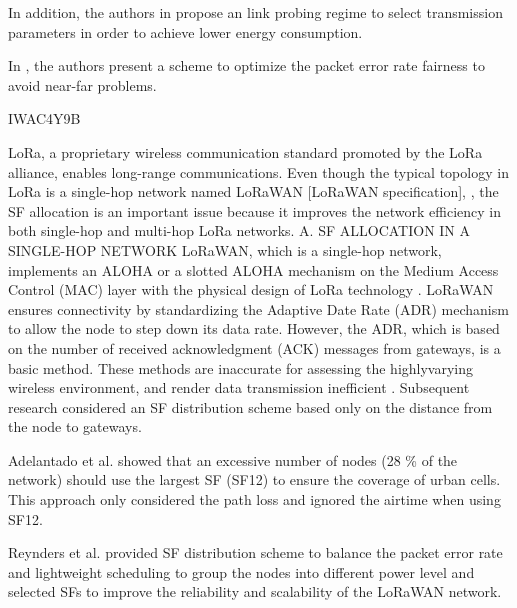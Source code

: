 In addition,
	the authors in \cite{bor_lora_2017} propose an link probing regime to select transmission parameters in order to achieve lower energy consumption.

In \cite{reynders_power_2017},
	the authors present a scheme to optimize the packet error rate fairness to avoid near-far problems.

\cite{zhu_improving_2019} IWAC4Y9B

LoRa,
	a proprietary wireless communication standard promoted by the LoRa alliance,
	enables long-range communications.
Even though the typical topology in LoRa is a single-hop network named LoRaWAN [LoRaWAN specification],
	\cite{pop_does_2017},
	the SF allocation is an important issue because it improves the network efficiency in both single-hop and multi-hop LoRa networks.
A.
SF ALLOCATION IN A SINGLE-HOP NETWORK LoRaWAN,
	which is a single-hop network,
	implements an ALOHA or a slotted ALOHA mechanism on the Medium Access Control (MAC) layer with the physical design of LoRa technology \cite{mahmood_scalability_2019}.
LoRaWAN ensures connectivity by standardizing the Adaptive Date Rate (ADR) mechanism to allow the node to step down its data rate.
However,
	the ADR,
	which is based on the number of received acknowledgment (ACK) messages from gateways,
	is a basic method.
These methods are inaccurate for assessing the highlyvarying wireless environment,
	and render data transmission inefficient \cite{kim_adaptive_2017}.
Subsequent research  \cite{adelantado_understanding_2017}
\cite{reynders_power_2017}
\cite{reynders_improving_2018}
\cite{slabicki_adaptive_2018}
considered an SF distribution scheme based only on the distance from the node to gateways.

Adelantado et al.
\cite{adelantado_understanding_2017} showed that an excessive number of nodes (28 \% of the network) should use the largest SF
(SF12) to ensure the coverage of urban cells.
This approach only considered the path loss and ignored the airtime when using SF12.

Reynders et al.
\cite{reynders_improving_2018} provided SF distribution scheme to balance the packet error rate \cite{reynders_power_2017} and lightweight scheduling to group the nodes into different power level and selected SFs to improve the reliability and scalability of the LoRaWAN network.

